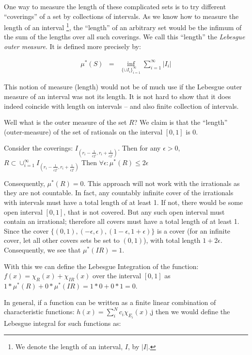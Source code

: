 \documentclass{article}
\begin{document}
One way to measure the length of these complicated sets is to try different ``coverings'' 
of a set by collections of intervals.
As we know how to measure the length of an interval%
\footnote{We denote the length of an interval, $I$, by $|I|$.}, the ``length'' of an arbitrary set 
would be the infimum of the sum of the lengths over all such coverings.
We call this ``length'' the {\em Lebesgue outer measure\/}. It is defined more precisely by:

\begin{eqnarray}
	\mu^*(S) & = & \inf_{\{\cup {I_i}\}_{i=1}^\infty} \sum_{i=1}^\infty |I_i|
\end{eqnarray}

This notion of measure (length) would not be of much use if the Lebesgue outer measure of
an interval was not its length.
It is not hard to show that it does indeed coincide with length on 
intervals -- and also finite collection of intervals.

Well what is the outer measure of the set $R$? We claim is that the ``length'' 
(outer-measure) of the set of rationals on the interval $[0,1]$ is $0$.

Consider the coverings: $I_(r_i - \frac{1}{\epsilon 2^i}, r_i + \frac{1}{\epsilon 2^i})$. 
Then for any
$\epsilon > 0$, $R \subset \cup_{i=1}^\infty I_(r_i - \frac{1}{\epsilon 2^i}, r_i + \frac{1}{\epsilon 2^i})$
Then $\forall \epsilon: \mu^*(R) \le 2 \epsilon$

Consequently, $\mu^*(R) = 0$. This approach will not work with the irrationals 
as they are not countable. In fact, any countably infinite cover of the 
irrationals with intervals must have a total length of at least 1. 
If not, there would be some open interval  $[0,1]$, that is not covered. 
But any such open 
interval must contain an irrational; therefore all covers must have a total length 
of at least 1. Since the cover $\{(0,1), (-\epsilon, \epsilon), (1 - \epsilon,1 + \epsilon)\}$
is a cover (for an infinite cover, let all other covers sets be set 
to $(0,1)$), with total length $1 + 2 \epsilon$.
Consequently, we see that $\mu^*(IR) = 1$.

With this we can define the Lebesgue Integration of the function: 
$f(x) = \chi_{R}(x) + \chi_{IR}(x)$ over the interval $[0,1]$ 
as $1 * \mu^*(R) + 0 * \mu^*(IR) = 1 * 0 + 0 * 1 = 0$.

In general, if a function can be written as a finite linear combination of 
characteristic functions: $h(x) = \sum_i^N c_i \chi_{E_i}(x)$,j
then we would define the Lebesgue integral for such functions as:
\end{document}

